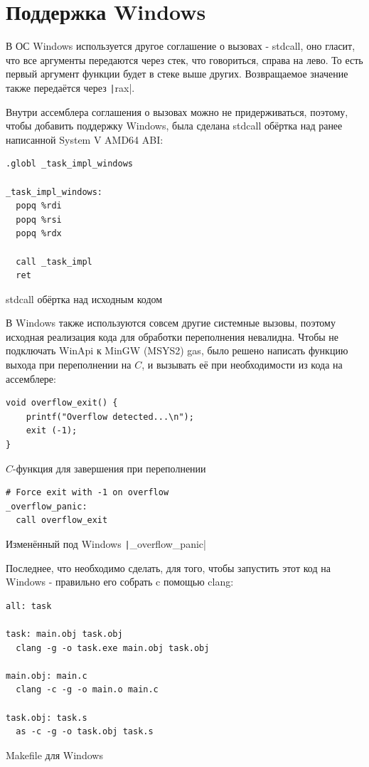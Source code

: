 \documentclass[a4paper]{article}
\begin{document}
  \section{Поддержка Windows}

  В ОС Windows используется другое соглашение о вызовах - stdcall,
  оно гласит, что все аргументы передаются через стек, что говориться, справа на лево.
  То есть первый аргумент функции будет в стеке выше других. Возвращаемое
  значение также передаётся через \texttt|rax|.

  Внутри ассемблера соглашения о вызовах можно не придерживаться,
  поэтому, чтобы добавить поддержку Windows, была сделана stdcall обёртка
  над ранее написанной System V AMD64 ABI:
  \begin{listing}[H]
    \begin{verbatim}
.globl _task_impl_windows

_task_impl_windows:
  popq %rdi
  popq %rsi
  popq %rdx

  call _task_impl
  ret
    \end{verbatim}
    \caption{stdcall обёртка над исходным кодом}
  \end{listing}

  В Windows также используются совсем другие системные вызовы, поэтому
  исходная реализация кода для обработки переполнения невалидна.
  Чтобы не подключать WinApi к MinGW (MSYS2) gas, было решено написать
  функцию выхода при переполнении на $C$, и вызывать её при необходимости
  из кода на ассемблере:
  \begin{listing}[H]
    \begin{verbatim}
void overflow_exit() {
    printf("Overflow detected...\n");
    exit (-1);
}
    \end{verbatim}
    \caption{$C$-функция для завершения при переполнении}
  \end{listing}

  \begin{listing}[H]
    \begin{verbatim}
# Force exit with -1 on overflow
_overflow_panic:
  call overflow_exit
    \end{verbatim}
    \caption{Изменённый под Windows \texttt|_overflow_panic|}
  \end{listing}

  Последнее, что необходимо сделать, для того, чтобы запустить этот код на Windows -
  правильно его собрать c помощью clang:
  \begin{listing}[H]
    \begin{verbatim}
all: task

task: main.obj task.obj
  clang -g -o task.exe main.obj task.obj

main.obj: main.c
  clang -c -g -o main.o main.c

task.obj: task.s
  as -c -g -o task.obj task.s
    \end{verbatim}
    \caption{Makefile для Windows}
  \end{listing}
\end{document}
